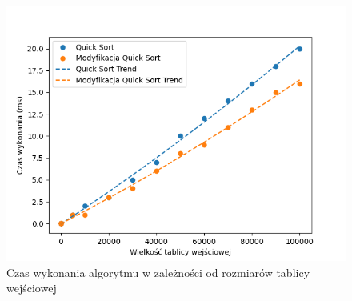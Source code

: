 \documentclass{article}
\begin{document}
\begin{figure}[H]
    \centering
    \includegraphics[width=1\textwidth]{Figure_2.png}
    \caption{Czas wykonania algorytmu w zależności od rozmiarów tablicy wejściowej}
    \label{fig:quicksortt}
\end{figure}
\end{document}
